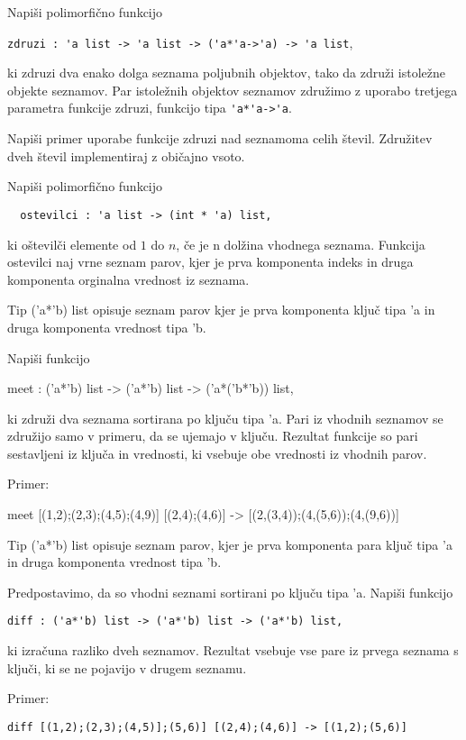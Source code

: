 \begin{ex}
Napi\v si polimorfi\v cno funkcijo 

\begin{center}
\lstinline{zdruzi : 'a list -> 'a list -> ('a*'a->'a) -> 'a list}, 
\end{center}

ki zdruzi dva enako dolga seznama poljubnih objektov, tako da zdru\v zi istole\v zne objekte seznamov. Par istole\v znih objektov seznamov zdru\v zimo z uporabo tretjega parametra funkcije zdruzi, funkcijo tipa \lstinline{'a*'a->'a}.

Napi\v si primer uporabe funkcije zdruzi nad seznamoma celih \v stevil. Zdru\v zitev dveh \v stevil implementiraj z obi\v cajno vsoto. 
\end{ex}
\begin{ex}
  Napi\v si polimorfi\v cno funkcijo
  \begin{lstlisting}
  ostevilci : 'a list -> (int * 'a) list, 
  \end{lstlisting}
  ki o\v stevil\v ci elemente od $1$ do $n$, \v ce je n dol\v zina
  vhodnega seznama. Funkcija ostevilci naj vrne seznam parov, kjer je
  prva komponenta indeks in druga komponenta orginalna vrednost iz
  seznama.

\end{ex} 
\begin{ex}
Tip ('a*'b) list opisuje seznam parov kjer je prva komponenta klju\v c tipa 'a in druga komponenta vrednost tipa 'b. 

Napi\v si funkcijo 

meet : ('a*'b) list -> ('a*'b) list -> ('a*('b*'b)) list,

ki zdru\v zi dva seznama sortirana po klju\v cu tipa 'a. Pari iz vhodnih seznamov se zdru\v zijo samo v primeru, da se ujemajo v klju\v cu. Rezultat funkcije so pari sestavljeni iz klju\v ca in vrednosti, ki vsebuje obe vrednosti iz vhodnih parov.  

Primer:    

meet [(1,2);(2,3);(4,5);(4,9)] [(2,4);(4,6)] -> 
     [(2,(3,4));(4,(5,6));(4,(9,6))]


\end{ex} 
\begin{ex}
  Tip ('a*'b) list opisuje seznam parov, kjer je prva komponenta para
  klju\v c tipa 'a in druga komponenta vrednost tipa 'b.

  Predpostavimo, da so vhodni seznami sortirani po klju\v cu tipa
  'a. Napi\v si funkcijo

\begin{lstlisting}
diff : ('a*'b) list -> ('a*'b) list -> ('a*'b) list,
\end{lstlisting}

  ki izra\v cuna razliko dveh seznamov. Rezultat vsebuje vse pare iz
  prvega seznama s klju\v ci, ki se ne pojavijo v drugem seznamu.

\noindent\/Primer:    
\begin{lstlisting}
diff [(1,2);(2,3);(4,5)];(5,6)] [(2,4);(4,6)] -> [(1,2);(5,6)]
\end{lstlisting}


\end{ex} 
